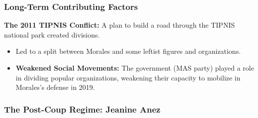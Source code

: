 \documentclass{article}
\begin{document}
    \subsubsection{Long-Term Contributing Factors}

    \noindent \textbf{The 2011 TIPNIS Conflict:} A plan to build a road
through the TIPNIS national park created divisions.
    \begin{itemize}
        \item Led to a split between Morales and some leftist figures and
        organizations.
        \item \textbf{Weakened Social Movements:} The government (MAS party)
        played a role in dividing popular organizations, weakening their
        capacity to mobilize in Morales's defense in 2019.
    \end{itemize}

    \subsubsection{The Post-Coup Regime: Jeanine Anez}
\end{document}
